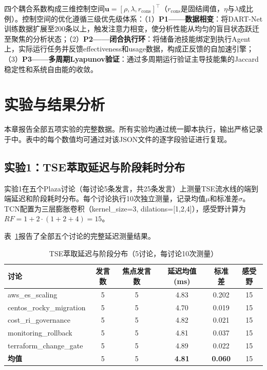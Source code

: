 \documentclass[12pt,a4paper]{ctexart}
\begin{document}
四个耦合系数构成三维控制空间$\mathbf{u} = [\rho, \lambda, r_{\text{cons}}]^\top$（$r_{\text{cons}}$是固结阈值，$\eta$与$\lambda$成比例）。控制空间的优化遵循三级优先级体系：（1）\textbf{P1——数据相变}：将DART-Net训练数据扩展至200条以上，触发注意力相变，使分析性能从均匀的盲目状态跃迁至聚焦的分析状态；（2）\textbf{P2——闭合执行环}：将储备池技能绑定到执行Agent上，实际运行任务并反馈effectiveness和usage数据，构成正反馈的自加速引擎；（3）\textbf{P3——多周期Lyapunov验证}：通过多周期运行验证主导技能集的Jaccard稳定性和系统自由能的收敛。

\section{实验与结果分析}

本章报告全部五项实验的完整数据。所有实验均通过统一脚本执行，输出严格记录于中。表中的每个数值均可通过对该JSON文件的逐字段验证进行复现。

\subsection{实验1：TSE萃取延迟与阶段耗时分布}

实验1在五个Plaza讨论（每讨论5条发言，共25条发言）上测量TSE流水线的端到端延迟和阶段耗时分布。每个讨论执行10次独立测量，记录均值$\mu$和标准差$\sigma$。TCN配置为三层膨胀卷积（kernel\_size=3, dilations=[1,2,4]），感受野计算为$RF = 1 + 2 \cdot (1+2+4) = 15$。

表~\ref{tab:tse_latency}报告了全部五个讨论的完整延迟测量结果。

\begin{table}[H]
\centering
\caption{TSE萃取延迟与阶段分布（5讨论，每讨论10次测量）}
\label{tab:tse_latency}
\renewcommand{\arraystretch}{1.15}
\begin{tabular}{lccccc}
\toprule
讨论 & 发言数 & 焦点发言数 & 延迟均值(ms) & 标准差 & 感受野 \\
\midrule
aws\_es\_scaling & 5 & 5 & 4.83 & 0.202 & 15 \\
centos\_rocky\_migration & 5 & 5 & 4.70 & 0.019 & 15 \\
cost\_ri\_governance & 5 & 5 & 4.82 & 0.021 & 15 \\
monitoring\_rollback & 5 & 5 & 4.81 & 0.037 & 15 \\
terraform\_change\_gate & 5 & 5 & 4.89 & 0.022 & 15 \\
\midrule
\textbf{均值} & 5 & 5 & \textbf{4.81} & \textbf{0.060} & 15 \\
\bottomrule
\end{tabular}
\end{table}
\end{document}
